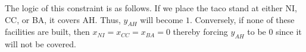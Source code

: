 \documentclass[12pt]{exam}
\begin{document}
\begin{questions}
\begin{parts}
\begin{subparts}
\begin{solution}[2in]
	The logic of this constraint is as follows. If we place the taco stand at either NI, CC, or BA, it covers AH. Thus, $y_{AH}$ will become $1$. Conversely, if none of these facilities are built, then $x_{NI} = x_{CC} = x_{BA} = 0$ thereby forcing $y_{AH}$ to be 0 since it will not be covered.	
	
	\end{solution}
	\end{subparts}
	\newpage
\end{parts}


\newpage 


\end{questions}
\end{document}

